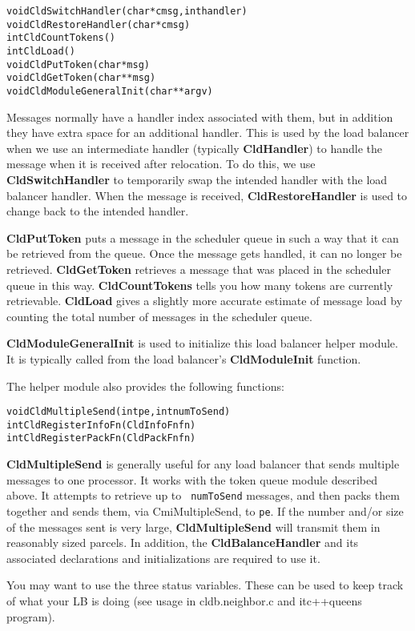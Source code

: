 \begin{alltt}
void CldSwitchHandler(char *cmsg, int handler)
void CldRestoreHandler(char *cmsg)
int CldCountTokens()
int CldLoad()
void CldPutToken(char *msg)
void CldGetToken(char **msg)
void CldModuleGeneralInit(char **argv)
\end{alltt}

Messages normally have a handler index associated with them, but in addition
they have extra space for an additional handler.  This is used by the
load balancer when we use an intermediate handler (typically {\bf
CldHandler}) to handle the message when it is received after
relocation.  To do this, we use {\bf CldSwitchHandler} to temporarily
swap the intended handler with the load balancer handler.  When the
message is received, {\bf CldRestoreHandler} is used to change back to
the intended handler. 

{\bf CldPutToken} puts a message in the scheduler queue in such a way
that it can be retrieved from the queue. Once the message gets
handled, it can no longer be retrieved.  {\bf CldGetToken} retrieves a
message that was placed in the scheduler queue in this way.
{\bf CldCountTokens} tells you how many tokens are currently
retrievable. {\bf CldLoad} gives a slightly more accurate estimate of
message load by counting the total number of messages in the
scheduler queue.

{\bf CldModuleGeneralInit} is used to initialize this load balancer
helper module.  It is typically called from the load balancer's {\bf
CldModuleInit} function.

The helper module also provides the following functions:

\begin{alltt}
void CldMultipleSend(int pe, int numToSend)
int CldRegisterInfoFn(CldInfoFn fn)
int CldRegisterPackFn(CldPackFn fn)
\end{alltt}

{\bf CldMultipleSend} is generally useful for any load balancer that
sends multiple messages to one processor.  It works with the token
queue module described above.  It attempts to retrieve up to {\tt
numToSend} messages, and then packs them together and sends them, via
CmiMultipleSend, to {\tt pe}.  If the number and/or size of the
messages sent is very large, {\bf CldMultipleSend} will transmit them
in reasonably sized parcels.  In addition, the {\bf CldBalanceHandler} and
its associated declarations and initializations are required to use it.

You may want to use the three status variables.  These can be used to
keep track of what your LB is doing (see usage in cldb.neighbor.c and
itc++queens program).

